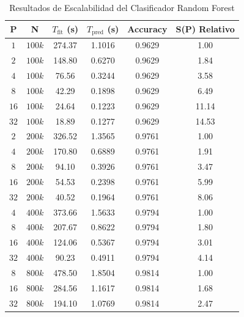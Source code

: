 \documentclass{article}
\begin{document}
\begin{table}[H]
\centering
\caption{Resultados de Escalabilidad del Clasificador Random Forest}
\label{tab:rf_results}
\begin{tabular}{cccccc}
\toprule
   P &      N &  $T_{\text{fit}}$ (s) &  $T_{\text{pred}}$ (s) &  Accuracy &  S(P) Relativo \\
\midrule
 $1$ & $100k$ &                274.37 &                 1.1016 &    0.9629 &           1.00 \\
 $2$ & $100k$ &                148.80 &                 0.6270 &    0.9629 &           1.84 \\
 $4$ & $100k$ &                 76.56 &                 0.3244 &    0.9629 &           3.58 \\
 $8$ & $100k$ &                 42.29 &                 0.1898 &    0.9629 &           6.49 \\
$16$ & $100k$ &                 24.64 &                 0.1223 &    0.9629 &          11.14 \\
$32$ & $100k$ &                 18.89 &                 0.1277 &    0.9629 &          14.53 \\
 $2$ & $200k$ &                326.52 &                 1.3565 &    0.9761 &           1.00 \\
 $4$ & $200k$ &                170.80 &                 0.6889 &    0.9761 &           1.91 \\
 $8$ & $200k$ &                 94.10 &                 0.3926 &    0.9761 &           3.47 \\
$16$ & $200k$ &                 54.53 &                 0.2398 &    0.9761 &           5.99 \\
$32$ & $200k$ &                 40.52 &                 0.1964 &    0.9761 &           8.06 \\
 $4$ & $400k$ &                373.66 &                 1.5633 &    0.9794 &           1.00 \\
 $8$ & $400k$ &                207.67 &                 0.8622 &    0.9794 &           1.80 \\
$16$ & $400k$ &                124.06 &                 0.5367 &    0.9794 &           3.01 \\
$32$ & $400k$ &                 90.23 &                 0.4911 &    0.9794 &           4.14 \\
 $8$ & $800k$ &                478.50 &                 1.8504 &    0.9814 &           1.00 \\
$16$ & $800k$ &                284.56 &                 1.1617 &    0.9814 &           1.68 \\
$32$ & $800k$ &                194.10 &                 1.0769 &    0.9814 &           2.47 \\
\bottomrule
\end{tabular}
\end{table}
\end{document}
